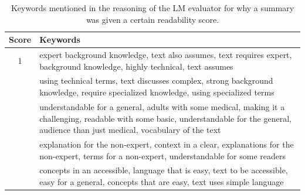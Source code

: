 \begin{table}[!h]
    \setlength{\tabcolsep}{3pt}
    \centering 
    \footnotesize
    \begin{tabular}{c|p{}}
         Score & Keywords \\ \hline \vspace*{1mm}
         1 & {expert background knowledge, text also assumes, text requires expert, background knowledge, highly technical, text assumes} \\ \hdash
         2 & {using technical terms, text discusses complex, strong background knowledge, require specialized knowledge, using specialized terms} \\ \hdash
         3 & {understandable for a general, adults with some medical, making it a challenging, readable with some basic, understandable for the general, audience than just medical, vocabulary of the text} \\ \hdash
         4 & {explanation for the non-expert, context in a clear, explanations for the non-expert, terms for a non-expert, understandable for some readers
} \\ \hdash
         5 & {concepts in an accessible, language that is easy, text to be accessible, easy for a general, concepts that are easy, text uses simple language
}
    \end{tabular}
    \caption{Keywords mentioned in the reasoning of the LM evaluator for why a summary was given a certain readability score.}\vspace{-2mm}
    \label{tab:keywords_by_score}
\end{table}